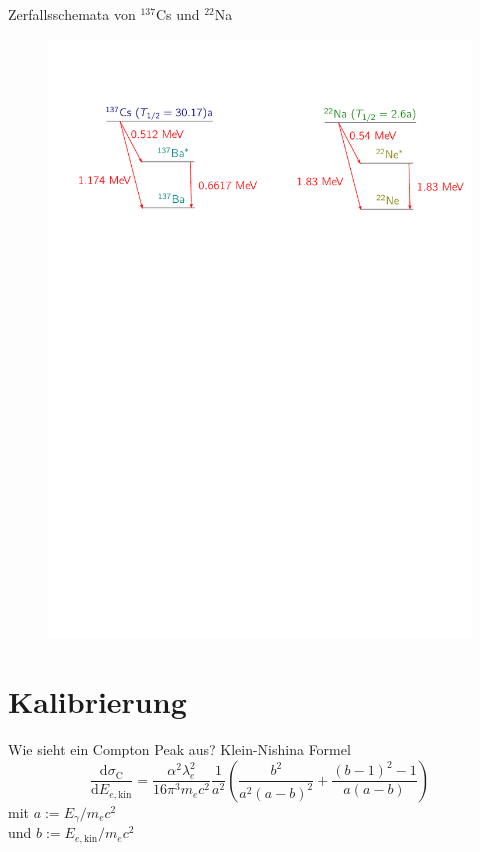 \documentclass[xcolor=x11names,compress]{beamer}
\renewcommand{\(}{\begin{columns}}
\renewcommand{\)}{\end{columns}}
\newcommand{\<}[1]{\begin{column}{#1}}
\renewcommand{\>}{\end{column}}
\begin{document}
\begin{frame}[t]{Zerfallsschemata von $^{137}$Cs und  $^{22}$Na}
 \begin{figure}[htpb]
    \centering
    \includegraphics[width=1.0\linewidth]{../figures/terms}
\label{fig:term_schemata}
\end{figure}
\end{frame}

\section{Kalibrierung}
\begin{frame}[t]{Wie sieht ein Compton Peak aus?}
    Klein-Nishina Formel
\begin{equation}
    \frac{\text{d} \sigma_\text{C}}{\text{d} E_{e, \text{kin}}} 
    = \frac{\alpha^2 \lambda_e^2}{16 \pi^3 m_e c^2}  \frac{1}{a^2}\left(
        \frac{b^2}{a^2(a - b)^2} + \frac{(b - 1)^2 - 1}{a (a - b)} \right) 
    \label{eq:dode}
\end{equation}
mit $a := E_\gamma / m_ec^2$ \\ 
und $b := E_{e, \text{kin}} / m_ec^2$ 
\end{frame}
\end{document}
